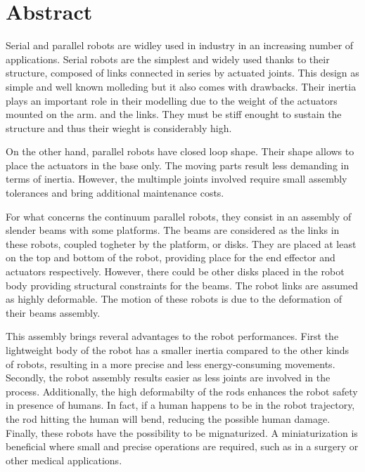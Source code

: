 \documentclass{thesisreport}
\begin{document}
   
 
  \section*{Abstract}
   
 Serial and parallel robots are widley used in industry in an increasing number of applications. Serial robots are the simplest and widely used thanks to their structure, composed of links connected in series by actuated joints. This design as simple and well known molleding but it also comes with drawbacks. Their inertia plays an important role in their modelling due to the weight of the actuators mounted on the arm. and the links. They must be stiff enought to sustain the structure and thus their wieght is considerably high.
 
 On the other hand, parallel robots have closed loop shape. Their shape allows to place the actuators in the base only. The moving parts result less demanding in terms of inertia. However, the multimple joints involved require small assembly tolerances and bring additional maintenance costs.
 
 For what concerns the continuum parallel robots, they consist in an assembly of slender beams with some platforms. The beams are considered as the links in these robots, coupled togheter by the platform, or disks. They are placed at least on the top and bottom of the robot, providing place for the end effector and actuators respectively. However, there could be other disks placed in the robot body providing structural constraints for the beams. The robot links are assumed as highly deformable. The motion of these robots is due to the deformation of their beams assembly. 
 
 This assembly brings reveral advantages to the robot performances. First the lightweight body of the robot has a smaller inertia compared to the other kinds of robots, resulting in a more precise and less energy-consuming movements. Secondly, the robot assembly results easier as less joints are involved in the process. Additionally, the high deformabilty of the rods enhances the robot safety in presence of humans. In fact, if a human happens to be in the robot trajectory, the rod hitting the human will bend, reducing the possible human damage. Finally, these robots have the possibility to be mignaturized. A miniaturization is beneficial where small and precise operations are required, such as in a surgery or other medical applications. 
 
\end{document}
